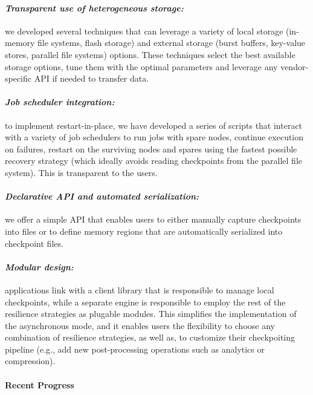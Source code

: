 \paragraph{\emph{Transparent use of heterogeneous storage:}} we
developed several techniques that can leverage a variety of local
storage (in-memory file systems, flash storage) and external storage
(burst buffers, key-value stores, parallel file systems)
options. These techniques select the best available storage options,
tune them with the optimal parameters and leverage any vendor-specific
API if needed to transfer data.
\vspace{-1em}

\paragraph{\emph{Job scheduler integration:}} to implement
restart-in-place, we have developed a series of scripts that interact
with a variety of job schedulers to run jobs with spare nodes,
continue execution on failures, restart on the surviving nodes and
spares using the fastest possible recovery strategy (which ideally
avoids reading checkpoints from the parallel file system). This is
transparent to the users.
\vspace{-1em}

\paragraph{\emph{Declarative API and automated serialization:}} we
offer a simple API that enables users to either manually capture
checkpoints into files or to define memory regions that are
automatically serialized into checkpoint files.
\vspace{-1em}

\paragraph{\emph{Modular design:}} applications link with a client
library that is responsible to manage local checkpoints, while a
separate engine is responsible to employ the rest of the resilience
strategies as plugable modules. This simplifies the implementation
of the asynchronous mode, and it enables users the flexibility to choose any
combination of resilience strategies, as well as, to customize their
checkpoiting pipeline (e.g., add new post-processing operations such
as analytics or compression).

\paragraph{Recent Progress}

